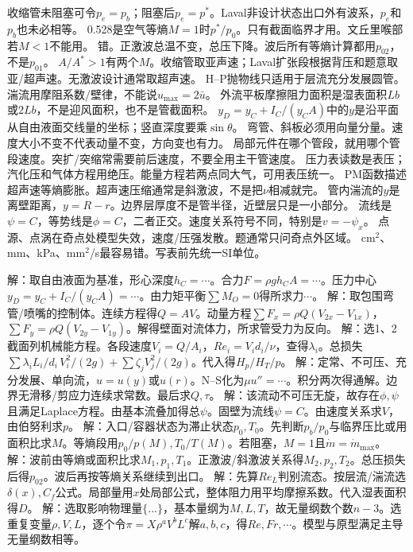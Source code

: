 收缩管未阻塞可令$p_e=p_b$；阻塞后$p_e=p^*$。Laval非设计状态出口外有波系，$p_e$和$p_b$也未必相等。
0.528是空气等熵$M=1$时$p^*/p_0$。只有截面临界才用。文丘里喉部若$M<1$不能用。
错。正激波总温不变，总压下降。波后所有等熵计算都用$p_{02}$，不是$p_{01}$。
$A/A^*>1$有两个$M$。收缩管取亚声速；Laval扩张段根据背压和题意取亚/超声速。无激波设计通常取超声速。
H--P抛物线只适用于层流充分发展圆管。湍流用摩阻系数/壁律，不能说$u_{\max}=2\bar u$。
外流平板摩擦阻力面积是湿表面积$Lb$或$2Lb$，不是迎风面积，也不是管截面积。
$y_D=y_C+I_C/(y_CA)$中的$y$是沿平面从自由液面交线量的坐标；竖直深度要乘$\sin\theta$。
弯管、斜板必须用向量分量。速度大小不变不代表动量不变，方向变也有力。
局部元件在哪个管段，就用哪个管段速度。突扩/突缩常需要前后速度，不要全用主干管速度。
压力表读数是表压；汽化压和气体方程用绝压。能量方程若两点同大气，可用表压统一。
PM函数描述超声速等熵膨胀。超声速压缩通常是斜激波，不是把$\nu$相减就完。
管内湍流的$y$是离壁距离，$y=R-r$。边界层厚度不是管半径，近壁层只是一小部分。
流线是$\psi=C$，等势线是$\phi=C$，二者正交。速度关系符号不同，特别是$v=-\psi_x$。
点源、点涡在奇点处模型失效，速度/压强发散。题通常只问奇点外区域。
cm$^2$、mm、kPa、mm$^2$/s最容易错。写表前先统一SI单位。

解：取自由液面为基准，形心深度$h_C=\cdots$。合力$F=\rho gh_CA=\cdots$。压力中心$y_D=y_C+I_C/(y_CA)=\cdots$。由力矩平衡$\sum M_O=0$得所求力$\cdots$。
解：取包围弯管/喷嘴的控制体。连续方程得$Q=AV$。动量方程$\sum F_x=\rho Q(V_{2x}-V_{1x})$，$\sum F_y=\rho Q(V_{2y}-V_{1y})$。解得壁面对流体力，所求管受力为反向。
解：选1、2截面列机械能方程。各段速度$V_i=Q/A_i$，$Re_i=V_id_i/\nu$，查得$\lambda_i$。总损失$\sum\lambda_iL_i/d_i\,V_i^2/(2g)+\sum\zeta_jV_j^2/(2g)$。代入得$H_p/H_T/p$。
解：定常、不可压、充分发展、单向流，$u=u(y)$或$u(r)$。N--S化为$\mu u''=\cdots$。积分两次得通解。边界无滑移/剪应力连续求常数。最后求$Q,\tau$。
解：该流动不可压无旋，故存在$\phi,\psi$且满足Laplace方程。由基本流叠加得总$\psi$。固壁为流线$\psi=C$。由速度关系求$V$，由伯努利求$p$。
解：入口/容器状态为滞止状态$p_0,T_0$。先判断$p_b/p_0$与临界压比或用面积比求$M$。等熵段用$p_0/p(M),T_0/T(M)$。若阻塞，$M=1$且$\dot m=\dot m_{\max}$。
解：波前由等熵或面积比求$M_1,p_1,T_1$。正激波/斜激波关系得$M_2,p_2,T_2$。总压损失后得$p_{02}$。波后再按等熵关系继续到出口。
解：先算$Re_L$判别流态。按层流/湍流选$\delta(x),C_f$公式。局部量用$x$处局部公式，整体阻力用平均摩擦系数。代入湿表面积得$D$。
解：选取影响物理量$\{...\}$，基本量纲为$M,L,T$，故无量纲数个数$n-3$。选重复变量$\rho,V,L$，逐个令$\pi=X\rho^aV^bL^c$解$a,b,c$，得$Re,Fr,\cdots$。模型与原型满足主导无量纲数相等。

